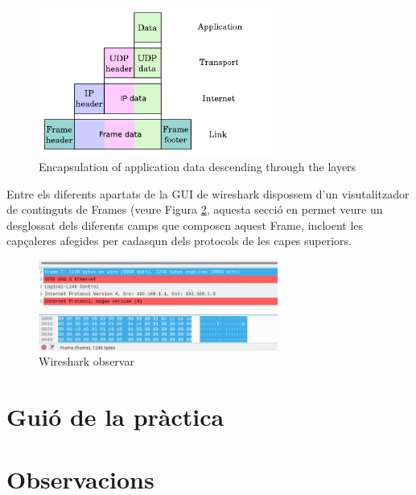 \documentclass[12pt,a4paper]{article}
\begin{document}
\begin{figure}[!ht]
  \begin{center}
    \includegraphics[width=0.7\textwidth]{encapsulation}
    \caption{Encapsulation of application data descending through the layers}
    \label{encapsulation}
  \end{center}
\end{figure}

Entre els diferents apartats de la GUI de wireshark dispossem d'un visutalitzador de continguts de Frames (veure Figura \ref{wireshark-frame},
aquesta secció en permet veure un desglossat dels diferents camps que composen aquest Frame, incloent les capçaleres
afegides per cadasqun dels protocols de les capes superiors.

\begin{figure}[!ht]
  \begin{center}
    \includegraphics[width=0.7\textwidth]{wireshark-frame}
    \caption{Wireshark observar}
    \label{wireshark-frame}
  \end{center}
\end{figure}

\section{Guió de la pràctica}

\section*{Observacions}
\end{document}
